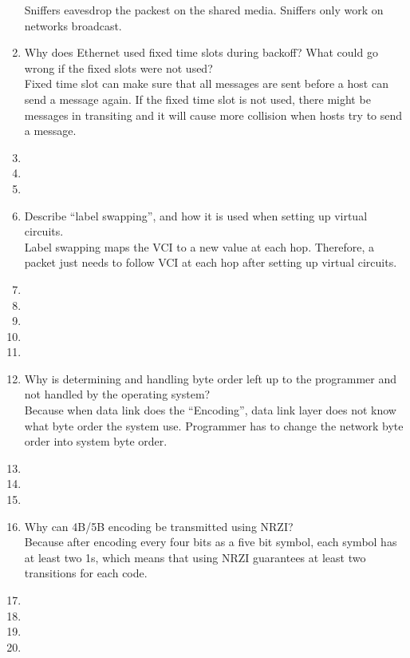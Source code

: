 \documentclass[10pt, a4paper]{article}
\begin{document}
\begin{enumerate}
    \color{blue}
    Sniffers eavesdrop the packest on the shared media. Sniffers only work on networks broadcast.
    \color{black}
\item\mbox{}Why does Ethernet used fixed time slots during backoff? What could go wrong if the fixed slots were not used?\\
    \color{blue}
    Fixed time slot can make sure that all messages are sent before a host can send a message again. If the fixed time slot is not used, there might be messages in transiting and it will cause more collision when hosts try to send a message.
    \color{black}
\item\mbox{}
\item\mbox{}
\item\mbox{}
\item\mbox{} Describe ``label swapping'', and how it is used when setting up virtual circuits.\\
    \color{blue}
    Label swapping maps the VCI to a new value at each hop. Therefore, a packet just needs to follow VCI at each hop after setting up virtual circuits.
    \color{black}
\item\mbox{}
\item\mbox{}
\item\mbox{}
\item\mbox{}
\item\mbox{}
\item\mbox{}Why is determining and handling byte order left up to the programmer and not handled by the operating system?\\
    \color{blue}
    Because when data link does the ``Encoding'', data link layer does not know what byte order the system use. Programmer has to change the network byte order into system byte order.
    \color{black}
\item\mbox{}
\item\mbox{}
\item\mbox{}
\item\mbox{} Why can 4B/5B encoding be transmitted using NRZI?\\
    \color{blue}
    Because after encoding every four bits as a five bit symbol, each symbol has at least two 1s, which means that using NRZI guarantees at least two transitions for each code.
    \color{black}
\item\mbox{}
\item\mbox{}
\item\mbox{}
\item\mbox{}

\end{enumerate}
\end{document}
